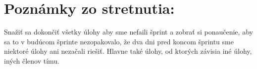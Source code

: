 \documentclass{article}
\begin{document}
    \section*{Poznámky zo stretnutia:}

    \textnormal {Snažiť sa dokončiť všetky úlohy aby sme nefaili šprint a zobrať si ponaučenie, aby sa to v budúcom šprinte nezopakovalo, že dva dni pred koncom šprintu sme niektoré úlohy ani nezačali riešiť. Hlavne také úlohy, od ktorých závisia iné úlohy, iných členov tímu.}
\end{document}
